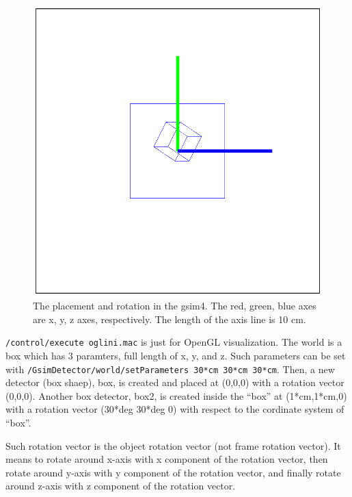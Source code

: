 \documentclass[a4paper,12pt]{article}
\begin{document}
 \begin{figure}[H]
  \begin{center}
   \includegraphics[bb=155 280 450 570,origin=c,scale=0.5,clip]{figure/box.eps}
  \end{center}
  \caption{The placement and rotation in the gsim4. The red, green, blue
  axes are x, y, z axes, respectively. The length of the axis line is 10
  cm.\label{box}} 
 \end{figure}

 {\tt /control/execute oglini.mac} is just for OpenGL visualization.
 The world is a box which has 3 paramters, full length of x, y, and z.
 Such parameters can be set with
 {\tt /GsimDetector/world/setParameters 30*cm 30*cm 30*cm}.
 Then, a new detector (box shaep), box, is created and placed at (0,0,0) with
 a rotation vector (0,0,0). Another box detector, box2, is created inside
 the ``box'' at (1*cm,1*cm,0) 
 with a rotation vector (30*deg 30*deg 0)
 with respect to the cordinate system of ``box''.
 
 Such rotation vector is the object rotation vector (not frame rotation
 vector). It means to rotate around x-axis with x component of the
 rotation vector, then rotate around y-axis with y component of the
 rotation vector, and finally rotate around z-axis with z component of
 the rotation vector.
 
\end{document}
